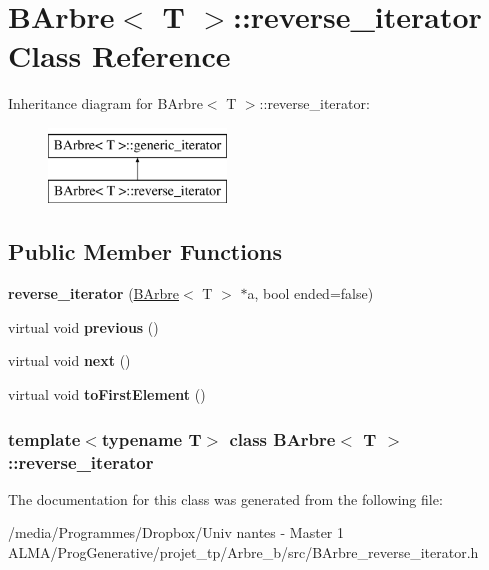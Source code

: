 \hypertarget{classBArbre_1_1reverse__iterator}{
\section{BArbre$<$ T $>$::reverse\_\-iterator Class Reference}
\label{classBArbre_1_1reverse__iterator}
}
Inheritance diagram for BArbre$<$ T $>$::reverse\_\-iterator:\begin{figure}[H]
\begin{center}
\leavevmode
\includegraphics[height=2.000000cm]{classBArbre_1_1reverse__iterator}
\end{center}
\end{figure}
\subsection*{Public Member Functions}
\begin{DoxyCompactItemize}
\item 
\hypertarget{classBArbre_1_1reverse__iterator_a0970e2dc74d754fd589001cc11073d15}{
{\bfseries reverse\_\-iterator} (\hyperlink{classBArbre}{BArbre}$<$ T $>$ $\ast$a, bool ended=false)}
\label{classBArbre_1_1reverse__iterator_a0970e2dc74d754fd589001cc11073d15}

\item 
\hypertarget{classBArbre_1_1reverse__iterator_a154ec414876ae73d6ade14af3573dfae}{
virtual void {\bfseries previous} ()}
\label{classBArbre_1_1reverse__iterator_a154ec414876ae73d6ade14af3573dfae}

\item 
\hypertarget{classBArbre_1_1reverse__iterator_a1ec32209dbbb17b83d63db39a4a3ea98}{
virtual void {\bfseries next} ()}
\label{classBArbre_1_1reverse__iterator_a1ec32209dbbb17b83d63db39a4a3ea98}

\item 
\hypertarget{classBArbre_1_1reverse__iterator_a64e48f58c7111d7c2dbde5eaf61806d9}{
virtual void {\bfseries toFirstElement} ()}
\label{classBArbre_1_1reverse__iterator_a64e48f58c7111d7c2dbde5eaf61806d9}

\end{DoxyCompactItemize}
\subsubsection*{template$<$typename T$>$ class BArbre$<$ T $>$::reverse\_\-iterator}



The documentation for this class was generated from the following file:\begin{DoxyCompactItemize}
\item 
/media/Programmes/Dropbox/Univ nantes -\/ Master 1 ALMA/ProgGenerative/projet\_\-tp/Arbre\_\-b/src/BArbre\_\-reverse\_\-iterator.h\end{DoxyCompactItemize}

